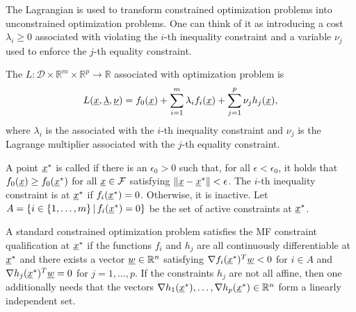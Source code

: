 The Lagrangian is used to transform constrained optimization problems into unconstrained optimization problems.
One can think of it as introducing a cost $\lambda_i \geq 0$ associated with violating the $i$-th inequality constraint and a variable $\nu_j$ used to enforce the $j$-th equality constraint.

\begin{definition} \label{def:lagrangian}
The  $L \colon \mathcal{D} \times \mathbb{R}^m \times \mathbb{R}^p \rightarrow \mathbb{R}$ associated with optimization problem is
\[ L(\underline{x},\underline{\lambda},\underline{\nu}) = f_0(\underline{x}) + \sum_{i=1}^m \lambda_i f_i(\underline{x}) + \sum_{j=1}^p \nu_j h_j(\underline{x}), \]
where $\lambda_i$ is the  associated with the $i$-th inequality constraint and $\nu_j$ is the Lagrange multiplier associated with the $j$-th equality constraint.
\end{definition}

\begin{definition}
A point $\underline{x}^*$ is called  if there is an $\epsilon_0 >0$ such that, for all $\epsilon< \epsilon_0$, it holds that $f_0 (\underline{x}) \geq f_0 (\underline{x}^*)$ for all $\underline{x} \in \mathcal{F}$ satisfying $\| \underline{x} - \underline{x}^* \| < \epsilon$.
The $i$-th inequality constraint is  at $\underline{x}^*$ if $f_i (\underline{x}^*)=0$.
Otherwise, it is inactive.
Let $A = \{ i\in \{1,\ldots,m\} \, | \, f_i (\underline{x}^*)=0 \}$ be the set of active constraints at $\underline{x}^*$.
\end{definition}

\begin{definition}
A standard constrained optimization problem satisfies the MF constraint qualification at $\underline{x}^*$ if the functions $f_i$ and $h_j$ are all continuously differentiable at $\underline{x}^*$ and there exists a vector $\underline{w}\in \mathbb{R}^n$ satisfying $\nabla f_i (\underline{x}^*)^T \underline{w} < 0$ for $i\in A$ and $\nabla h_j (\underline{x}^*)^T \underline{w} = 0$ for $j = 1,\ldots,p$.
If the constraints $h_j$ are not all affine, then one additionally needs that the vectors $\nabla h_1 (\underline{x}^*),\ldots,\nabla h_p (\underline{x}^*) \in \mathbb{R}^n$ form a linearly independent set.
\end{definition}

